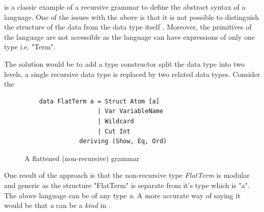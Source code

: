 \documentclass[thesis-solanki.tex]{subfiles}
\begin{document}
 is a classic example of a recursive grammar to define the
abstract syntax of a language.
One of the issues with the above  is that it is not possible to distinguish the structure of the data from the
data type itself \cite{sheard2004two}.
Moreover, the primitives of the language
are not accessible as the language can have expressions of only one
type i.e.
"Term".

The solution  would be to add a type constructor split the data type into two levels, a single recursive
data type is replaced by two related data types.
Consider the 
\begin{figure}
  \begin{verbatim}
    data FlatTerm a = Struct Atom [a]
                    | Var VariableName
                    | Wildcard
                    | Cut Int
               deriving (Show, Eq, Ord)
  \end{verbatim}
  \caption{A flattened (non-recursive) grammar}
  \label{tab:non-recurse}
\end{figure}

One result of the approach is that the non-recursive type
\textit{FlatTerm} is modular and generic as the structure
"FlatTerm"
is separate
from it's
type which is "a".
The above language can be of any type \textit{a}. A more accurate way of saying it would be that \textit{a} can be a \textit{kind} in
.
\end{document}
